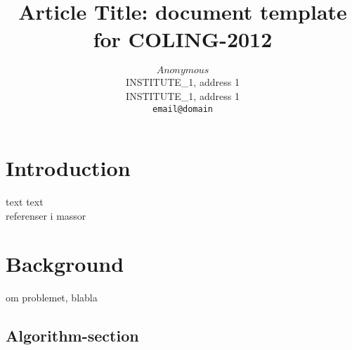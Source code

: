 \documentclass[10pt,a5paper,twoside]{article}
\title{Article Title: document template for COLING-2012}
\author{$Anonymous$\\
{\small  
  INSTITUTE\_1, address 1\\
  INSTITUTE\_1, address 1\\
  \texttt{email@domain} \\ 
}}
\begin{document}
\maketitle







\newpage

\section{Introduction}
text text\\
referenser i massor\\
\section{Background}
om problemet, blabla

\subsection{Algorithm-section}
\end{document}
